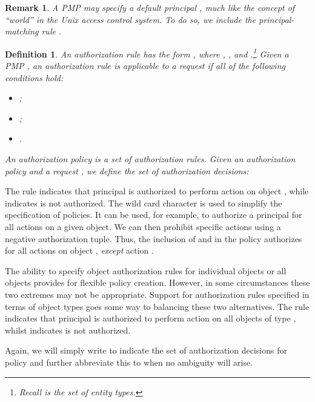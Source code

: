 \documentclass{article}
\newtheorem{definition}{Definition}
\newtheorem{remark}{Remark}
\begin{document}
\begin{remark}
 A PMP may specify a default principal , much like the concept of ``world'' in the Unix access control system.
 To do so, we include the principal-matching rule .
\end{remark}

\begin{definition}\label{def:auth-decisions}
  An \emph{authorization rule} has the form , where , ,  and .\footnote{Recall  is the set of entity types.}
  Given a PMP , an authorization rule  is applicable to a request  if all of the following conditions hold:
  \begin{itemize}
   \item ;
   \item ;
   \item .
  \end{itemize}
    An \emph{authorization policy} is a set of authorization rules.
    Given an authorization policy 
    and a request , we define the set of \emph{authorization decisions}:
    
\end{definition}

The rule  indicates that principal  is authorized to perform action  on object , while  indicates  is not authorized.
The wild card character  is used to simplify the specification of policies.
It can be used, for example, to authorize a principal for all actions on a given object.
We can then prohibit specific actions using a negative authorization tuple.
Thus, the inclusion of  and  in the policy authorizes  for all actions on object , \emph{except} action .

The ability to specify object authorization rules for individual objects  or all objects  provides for flexible policy creation.
However, in some circumstances these two extremes may not be appropriate.
Support for authorization rules specified in terms of object types goes some way to balancing these two alternatives.
The rule  indicates that principal  is authorized to perform action  on all objects of type , whilst  indicates  is not authorized.

Again, we will simply write  to indicate the set of authorization decisions for policy  and further abbreviate this to  when no ambiguity will arise.
\end{document}
